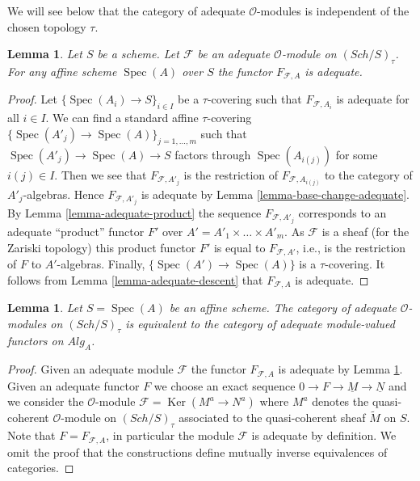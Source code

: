 \documentclass{stacks-project}
\theoremstyle{plain}
\newtheorem{lemma}[subsection]{Lemma}
\theoremstyle{definition}
\theoremstyle{remark}
\numberwithin{equation}{subsection}
\def\Spec{\mathop{\mathrm{Spec}}}
\def\Sch{\mathit{Sch}}
\def\Ker{\mathop{\mathrm{Ker}}}
\begin{document}
\noindent
We will see below that the category of adequate $\mathcal{O}$-modules
is independent of the chosen topology $\tau$.

\begin{lemma}
\label{lemma-adequate-local}
Let $S$ be a scheme. Let $\mathcal{F}$ be an adequate $\mathcal{O}$-module on
$(\Sch/S)_\tau$. For any affine scheme $\Spec(A)$ over $S$
the functor $F_{\mathcal{F}, A}$ is adequate.
\end{lemma}

\begin{proof}
Let $\{\Spec(A_i) \to S\}_{i \in I}$ be a $\tau$-covering
such that $F_{\mathcal{F}, A_i}$ is adequate for all $i \in I$.
We can find a standard affine $\tau$-covering
$\{\Spec(A'_j) \to \Spec(A)\}_{j = 1, \ldots, m}$
such that $\Spec(A'_j) \to \Spec(A) \to S$ factors
through $\Spec(A_{i(j)})$ for some $i(j) \in I$. Then we see that
$F_{\mathcal{F}, A'_j}$ is the restriction of
$F_{\mathcal{F}, A_{i(j)}}$ to the category of $A'_j$-algebras.
Hence $F_{\mathcal{F}, A'_j}$ is adequate by
Lemma \ref{lemma-base-change-adequate}.
By
Lemma \ref{lemma-adequate-product}
the sequence
$F_{\mathcal{F}, A'_j}$ corresponds to an adequate ``product'' functor
$F'$ over $A' = A'_1 \times \ldots \times A'_m$. As $\mathcal{F}$ is a
sheaf (for the Zariski topology) this product functor $F'$ is equal
to $F_{\mathcal{F}, A'}$, i.e., is the restriction of $F$ to $A'$-algebras.
Finally,  $\{\Spec(A') \to \Spec(A)\}$ is a $\tau$-covering.
It follows from
Lemma \ref{lemma-adequate-descent}
that $F_{\mathcal{F}, A}$ is adequate.
\end{proof}

\begin{lemma}
\label{lemma-adequate-affine}
Let $S = \Spec(A)$ be an affine scheme. The category of adequate
$\mathcal{O}$-modules on $(\Sch/S)_\tau$ is equivalent to the
category of adequate module-valued functors on $\textit{Alg}_A$.
\end{lemma}

\begin{proof}
Given an adequate module $\mathcal{F}$ the functor $F_{\mathcal{F}, A}$
is adequate by Lemma \ref{lemma-adequate-local}.
Given an adequate functor $F$ we choose an exact sequence
$0 \to F \to \underline{M} \to \underline{N}$ and we consider
the $\mathcal{O}$-module $\mathcal{F} = \Ker(M^a \to N^a)$ where
$M^a$ denotes the quasi-coherent $\mathcal{O}$-module on
$(\Sch/S)_\tau$ associated to the quasi-coherent sheaf
$\widetilde{M}$ on $S$. Note that $F = F_{\mathcal{F}, A}$, in particular
the module $\mathcal{F}$ is adequate by definition.
We omit the proof that the constructions define mutually inverse
equivalences of categories.
\end{proof}
\end{document}
